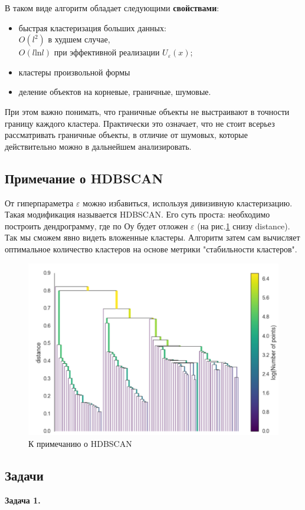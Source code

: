 В таком виде алгоритм обладает следующими \textbf{свойствами}:
\begin{itemize}
    \item быстрая кластеризация больших данных: \\$O(l^2)$ в худшем случае, \\ $O(l \mathrm{ln} l)$ при эффективной реализации $U_\varepsilon (x)$;
    \item кластеры произвольной формы
    \item деление объектов на корневые, граничные, шумовые.
\end{itemize}

При этом важно понимать, что граничные объекты не выстраивают в точности границу каждого кластера. Практически это означает, что не стоит всерьез рассматривать граничные объекты, в отличие от шумовых, которые действительно можно в дальнейшем анализировать.

\subsection{Примечание о HDBSCAN} 
От гиперпараметра $\varepsilon$ можно избавиться, используя дивизивную кластеризацию. Такая модификация называется HDBSCAN. Его суть проста: необходимо построить дендрограмму, где по $Оу$ будет отложен $\varepsilon$ (на рис.\ref{fig:hdbdendro} снизу distance). Так мы сможем явно видеть вложенные кластеры. Алгоритм затем сам вычисляет оптимальное количество кластеров на основе метрики "стабильности кластеров".

\begin{figure}[h!]
    \centering
    \includegraphics[width=0.6\linewidth]{png/hdbscan_dendrogramm.png}
    \caption{К примечанию о HDBSCAN}
    \label{fig:hdbdendro}
\end{figure}
\subsection{Задачи}
\textbf{Задача 1.}

